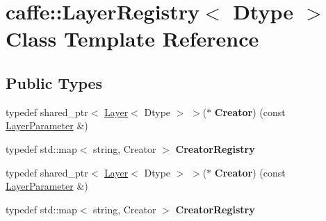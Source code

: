 \hypertarget{classcaffe_1_1_layer_registry}{}\section{caffe\+:\+:Layer\+Registry$<$ Dtype $>$ Class Template Reference}
\label{classcaffe_1_1_layer_registry}
\subsection*{Public Types}
\begin{DoxyCompactItemize}
\item 
\mbox{\label{classcaffe_1_1_layer_registry_a7b228e5912a515ef6dcf3f90653a62a2}} 
typedef shared\+\_\+ptr$<$ \mbox{\hyperlink{classcaffe_1_1_layer}{Layer}}$<$ Dtype $>$ $>$($\ast$ {\bfseries Creator}) (const \mbox{\hyperlink{classcaffe_1_1_layer_parameter}{Layer\+Parameter}} \&)
\item 
\mbox{\label{classcaffe_1_1_layer_registry_aa3da63563bd0b8c5ed49a5b5bdf8b0ff}} 
typedef std\+::map$<$ string, Creator $>$ {\bfseries Creator\+Registry}
\item 
\mbox{\label{classcaffe_1_1_layer_registry_a7b228e5912a515ef6dcf3f90653a62a2}} 
typedef shared\+\_\+ptr$<$ \mbox{\hyperlink{classcaffe_1_1_layer}{Layer}}$<$ Dtype $>$ $>$($\ast$ {\bfseries Creator}) (const \mbox{\hyperlink{classcaffe_1_1_layer_parameter}{Layer\+Parameter}} \&)
\item 
\mbox{\label{classcaffe_1_1_layer_registry_aa3da63563bd0b8c5ed49a5b5bdf8b0ff}} 
typedef std\+::map$<$ string, Creator $>$ {\bfseries Creator\+Registry}
\end{DoxyCompactItemize}
